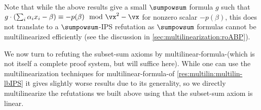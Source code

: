 \documentclass{toc}
\begin{document}
Note that while the above results give a small $\sumpowsum$ formula $g$ such that $g\cdot (\sum_i\alpha_i x_i-\beta)\equiv -p(\beta)\mod\vx^2-\vx$ for nonzero scalar $-p(\beta)$, this does not translate to a $\sumpowsum$-IPS refutation as $\sumpowsum$ formulas cannot be multilinearized efficiently (see the discussion in \autoref{sec:multilinearization:roABP}).

We now turn to refuting the subset-sum axioms by multilinear-formula-\lIPS (which is not itself a complete proof system, but will suffice here).  While one can use the multilinearization techniques for multilinear-formula-\lbIPS of \autoref{res:multilin:multilin-lbIPS} it gives slightly worse results due to its generality, so we directly multilinearize the refutations we built above using that the subset-sum axiom is linear.
\end{document}

